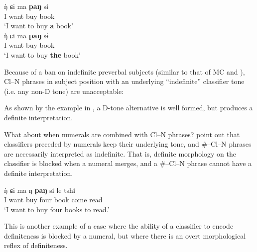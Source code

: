 \documentclass[output=paper
,modfonts
,nonflat]{langsci/langscibook}
\begin{document}
\ea \label{ex:hall:21}
\ea
\gll 
{\`ŋ} ɕi ma \textbf{paŋ} sɨ\\
I want buy {} book\\
\glt
`I want to buy \textbf{a} book'\\
\ex
\gll
{\`ŋ} ɕi ma \textbf{paŋ} sɨ\\
I want buy {} book\\
\glt
`I want to buy \textbf{the} book'\\
\z
\z \newpage 

Because of a ban on indefinite preverbal subjects (similar to that of MC and ), Cl--N phrases in subject position with an underlying ``indefinite'' classifier tone (i.e. any non-D tone) are unacceptable:

\ea \label{ex:hall:22}
\z 
\z 

As shown by the example in , a D-tone alternative is well formed, but produces a definite interpretation. 

What about when numerals are combined with Cl--N phrases? \citet{ChengSybesma2005} point out that classifiers preceded by numerals keep their underlying tone, and \#--Cl--N phrases are necessarily interpreted as indefinite. That is, definite morphology on the classifier is blocked when a numeral merges, and a \#--Cl--N phrase cannot have a definite interpretation.

\ea 
\gll
{\`ŋ} ɕi ma ŋ \textbf{paŋ} sɨ le tshɨ\\
I want buy four {} book come read\\
\glt
`I want to buy four books to read.'\\
\z 

This is another example of a case where the ability of a classifier to encode definiteness is blocked by a numeral, but where there is an overt morphological reflex of definiteness. 
\end{document}
